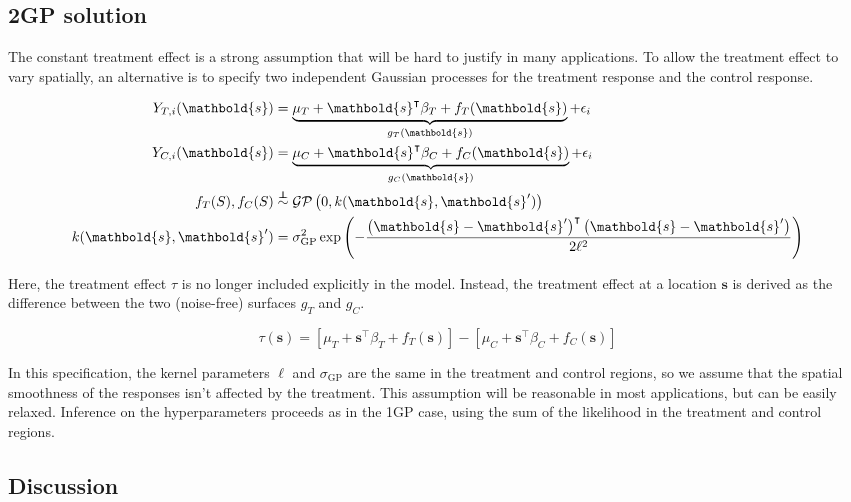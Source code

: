 \documentclass[letter]{article}
\newcommand{\genericdel}[3]{%
      \left#1#3\right#2
    }
\newcommand{\del}[1]{\genericdel(){#1}}
\newcommand{\sbr}[1]{\genericdel[]{#1}}
\newcommand{\gp}{\mathcal{GP}}
\newcommand{\trans}{^{\intercal}}
\newcommand{\sigmaf}{\sigma_{\mathrm{GP}}}
\newcommand{\svec}{\mathbold{s}}
\newcommand{\indep}{\protect\mathpalette{\protect\independenT}{\perp}}
\def\independenT#1#2{\mathrel{\rlap{$#1#2$}\mkern2mu{#1#2}}}
\begin{document}
    	\subsection{2GP solution}\label{gp-solution}
    

\label{sec:twogp}
    	The constant treatment effect is a strong assumption that will be hard
to justify in many applications. To allow the treatment effect to vary
spatially, an alternative is to specify two independent Gaussian
processes for the treatment response and the control response.

\begin{equation}
\label{eq:spec2gp}
\begin{split}
Y_{T,i}(\svec) &= \underbrace{\mu_T + \svec\trans\beta_T + f_T(\svec)}_{g_T(\svec)} + \epsilon_i \\
Y_{C,i}(\svec) &= \underbrace{\mu_C + \svec\trans\beta_C + f_C(\svec)}_{g_C(\svec)} + \epsilon_i \\
f_T(S), f_C(S) &\overset{\indep}{\sim} \gp\del{0, k(\svec, \svec')} \\
k(\svec,\svec') &= \sigmaf^2 \exp\del{ - \frac{\del{\svec-\svec'}\trans\del{\svec-\svec'}}{2 \ell^2}}
\end{split}
\end{equation}

Here, the treatment effect \(\tau\) is no longer included explicitly in
the model. Instead, the treatment effect at a location \(\svec\) is
derived as the difference between the two (noise-free) surfaces \(g_T\)
and \(g_C\).

\begin{equation}
\tau(\svec) = \sbr{\mu_T + \svec\trans\beta_T + f_T(\svec)} - \sbr{\mu_C + \svec\trans\beta_C + f_C(\svec)}
\end{equation}

In this specification, the kernel parameters \(\ell\) and \(\sigmaf\)
are the same in the treatment and control regions, so we assume that the
spatial smoothness of the responses isn't affected by the treatment.
This assumption will be reasonable in most applications, but can be
easily relaxed. Inference on the hyperparameters proceeds as in the 1GP
case, using the sum of the likelihood in the treatment and control
regions.
    


    	\subsection{Discussion}\label{discussion}
\end{document}
